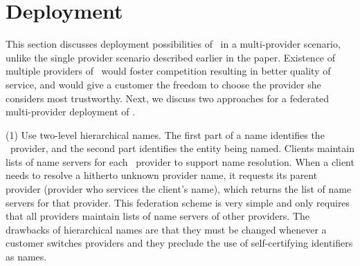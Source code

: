\section{Deployment}

This section discusses deployment possibilities of \auspice\ in a multi-provider scenario, unlike the single provider scenario described earlier in the paper. Existence of multiple providers of \auspice\ would foster competition resulting in better quality of service, and would give a customer the freedom to choose the provider she considers most trustworthy. Next, we  discuss two approaches for a federated multi-provider deployment of \auspice.


(1) Use two-level hierarchical names. The first part of a name identifies the \auspice\ provider, and the second part identifies the entity being named. Clients maintain lists of name servers for each \auspice\ provider to support name resolution.  When a client needs to resolve a hitherto unknown provider name, it requests its parent provider (provider who services the client's name), which returns the list of name servers for that provider. This federation scheme is very simple and only requires that all providers maintain lists of name servers of other providers. The drawbacks of hierarchical names are that they must be changed whenever a customer switches providers and they preclude the use of self-certifying identifiers \cite{ROFL} as names.


